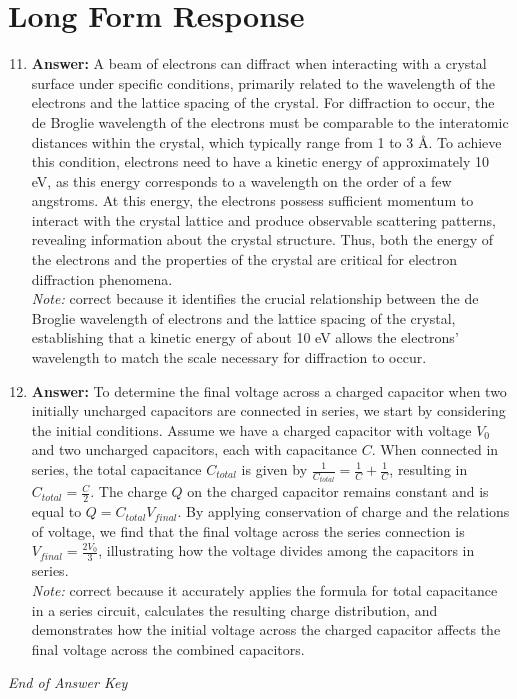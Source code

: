 \documentclass[12pt]{article}
\begin{document}
\section*{Long Form Response}
\begin{enumerate}[label=\arabic*.]
\setcounter{enumi}{10}
\item \textbf{Answer:} A beam of electrons can diffract when interacting with a crystal surface under specific conditions, primarily related to the wavelength of the electrons and the lattice spacing of the crystal. For diffraction to occur, the de Broglie wavelength of the electrons must be comparable to the interatomic distances within the crystal, which typically range from 1 to 3 Å. To achieve this condition, electrons need to have a kinetic energy of approximately 10 eV, as this energy corresponds to a wavelength on the order of a few angstroms. At this energy, the electrons possess sufficient momentum to interact with the crystal lattice and produce observable scattering patterns, revealing information about the crystal structure. Thus, both the energy of the electrons and the properties of the crystal are critical for electron diffraction phenomena.
\\ \textit{Note:} correct because it identifies the crucial relationship between the de Broglie wavelength of electrons and the lattice spacing of the crystal, establishing that a kinetic energy of about 10 eV allows the electrons' wavelength to match the scale necessary for diffraction to occur.
\item \textbf{Answer:} To determine the final voltage across a charged capacitor when two initially uncharged capacitors are connected in series, we start by considering the initial conditions. Assume we have a charged capacitor with voltage \( V_0 \) and two uncharged capacitors, each with capacitance \( C \). When connected in series, the total capacitance \( C_{total} \) is given by \( \frac{1}{C_{total}} = \frac{1}{C} + \frac{1}{C} \), resulting in \( C_{total} = \frac{C}{2} \). The charge \( Q \) on the charged capacitor remains constant and is equal to \( Q = C_{total} V_{final} \). By applying conservation of charge and the relations of voltage, we find that the final voltage across the series connection is \( V_{final} = \frac{2 V_0}{3} \), illustrating how the voltage divides among the capacitors in series.
\\ \textit{Note:} correct because it accurately applies the formula for total capacitance in a series circuit, calculates the resulting charge distribution, and demonstrates how the initial voltage across the charged capacitor affects the final voltage across the combined capacitors.
\end{enumerate}

\vfill
\noindent\textit{End of Answer Key}
\end{document}
